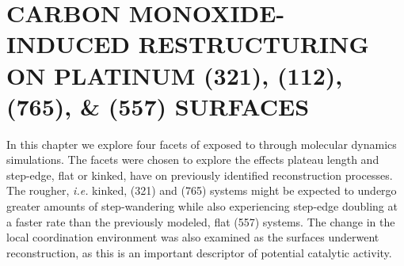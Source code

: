 \chapter{CARBON MONOXIDE-INDUCED RESTRUCTURING ON PLATINUM (321), (112), (765), \& (557) SURFACES}
\label{chap:facet}



In this chapter we explore four facets of  exposed to  through
molecular dynamics simulations. The facets were chosen to explore the effects
plateau length and step-edge, flat or kinked, have on previously identified
reconstruction processes. The rougher, {\em i.e.} kinked, (321) and (765)
systems might be expected to undergo greater amounts of step-wandering while
also experiencing step-edge doubling at a faster rate than the previously
modeled, flat (557) systems. The change in the local coordination environment was also
examined as the surfaces underwent reconstruction, as this is an important
descriptor of potential catalytic activity. 

